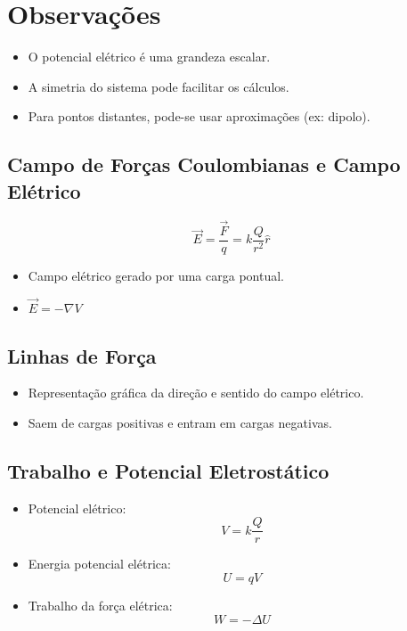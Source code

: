 \documentclass[a4paper,12pt]{article}
\begin{document}
\section{Observações}

\begin{itemize}
  \item O potencial elétrico é uma grandeza escalar.
  \item A simetria do sistema pode facilitar os cálculos.
  \item Para pontos distantes, pode-se usar aproximações (ex: dipolo).
\end{itemize}

\subsection{Campo de Forças Coulombianas e Campo Elétrico}
\begin{equation*}
    \vec{E} = \frac{\vec{F}}{q} = k \frac{Q}{r^2} \hat{r}
\end{equation*}
\begin{itemize}
    \item Campo elétrico gerado por uma carga pontual.
    \item $\vec{E} = - \nabla V$
\end{itemize}

\subsection{Linhas de Força}
\begin{itemize}
    \item Representação gráfica da direção e sentido do campo elétrico.
    \item Saem de cargas positivas e entram em cargas negativas.
\end{itemize}

\subsection{Trabalho e Potencial Eletrostático}
\begin{itemize}
    \item Potencial elétrico: 
    \[
        V = k \frac{Q}{r}
    \]
    \item Energia potencial elétrica: 
    \[
        U = qV
    \]
    \item Trabalho da força elétrica:
    \[
        W = -\Delta U
    \]
\end{itemize}
\end{document}
